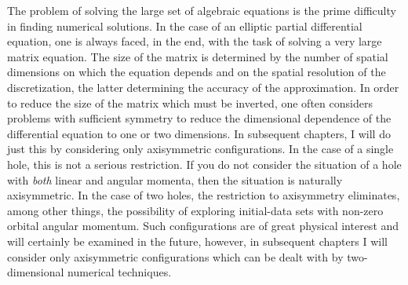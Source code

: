 The problem of solving the large set of algebraic equations is the prime
difficulty in finding numerical solutions.  In the case of an elliptic partial
differential equation, one is always faced, in the end, with the task of
solving a very large matrix equation.  The size of the matrix is determined by
the number of spatial dimensions on which the equation depends and on the spatial
resolution of the discretization, the latter determining the accuracy of the
approximation.  In order to reduce the size of the matrix which must be
inverted, one often considers problems with sufficient symmetry to reduce the
dimensional dependence of the differential equation to one or two dimensions. 
In subsequent chapters, I will do just this by considering only axisymmetric
configurations.  In the case of a single hole, this is not a serious
restriction.  If you do not consider the situation of a hole with {\it both}
linear and angular momenta, then the situation is naturally axisymmetric.  In
the case of two holes, the restriction to axisymmetry eliminates, among other
things, the possibility of exploring initial-data sets with non-zero orbital
angular momentum.  Such configurations are of great physical interest and will
certainly be examined in the future, however, in subsequent chapters I will
consider only axisymmetric configurations which can be dealt with by
two-dimensional numerical techniques.
\vfill
\eject